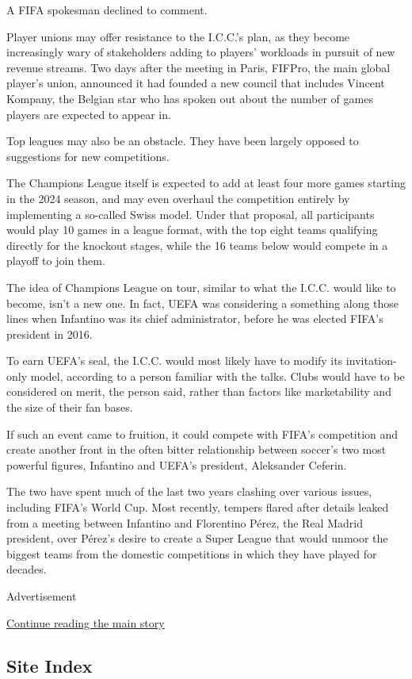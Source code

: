 A FIFA spokesman declined to comment.

Player unions may offer resistance to the I.C.C.'s plan, as they become
increasingly wary of stakeholders adding to players' workloads in
pursuit of new revenue streams. Two days after the meeting in Paris,
FIFPro, the main global player's union, announced it had founded a new
council that includes Vincent Kompany, the Belgian star who has spoken
out about the number of games players are expected to appear in.

Top leagues may also be an obstacle. They have been largely opposed to
suggestions for new competitions.

The Champions League itself is expected to add at least four more games
starting in the 2024 season, and may even overhaul the competition
entirely by implementing a so-called Swiss model. Under that proposal,
all participants would play 10 games in a league format, with the top
eight teams qualifying directly for the knockout stages, while the 16
teams below would compete in a playoff to join them.

The idea of Champions League on tour, similar to what the I.C.C. would
like to become, isn't a new one. In fact, UEFA was considering a
something along those lines when Infantino was its chief administrator,
before he was elected FIFA's president in 2016.

To earn UEFA's seal, the I.C.C. would most likely have to modify its
invitation-only model, according to a person familiar with the talks.
Clubs would have to be considered on merit, the person said, rather than
factors like marketability and the size of their fan bases.

If such an event came to fruition, it could compete with FIFA's
competition and create another front in the often bitter relationship
between soccer's two most powerful figures, Infantino and UEFA's
president, Aleksander Ceferin.

The two have spent much of the last two years clashing over various
issues, including FIFA's World Cup. Most recently, tempers flared after
details leaked from a meeting between Infantino and Florentino Pérez,
the Real Madrid president, over Pérez's desire to create a Super League
that would unmoor the biggest teams from the domestic competitions in
which they have played for decades.

Advertisement

\protect\hyperlink{after-bottom}{Continue reading the main story}

\hypertarget{site-index}{%
\subsection{Site Index}\label{site-index}}

